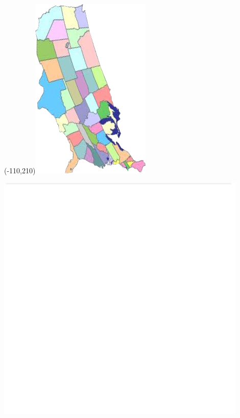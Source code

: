 \begin{frame}
\begin{minipage}{0.5\textwidth}
        \Put(-110,210){\includegraphics[width=.6\textwidth]{img/us-map-stretched.png}}
    \end{minipage}
    \begin{minipage}{0.2\textwidth}
        \centering
        \includegraphics[width=0.9\textwidth]{img/white-seal.png} \\ 
    \end{minipage}
\end{frame}

